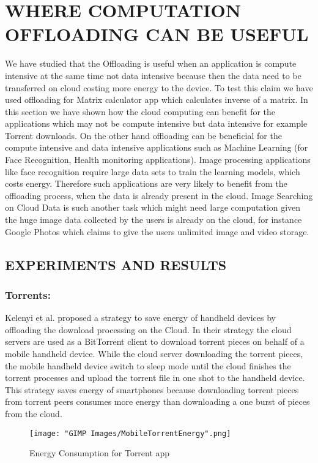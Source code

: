 \documentclass[12pt]{report}
\begin{document}
\chapter{WHERE COMPUTATION OFFLOADING CAN BE USEFUL}
We have studied that the Offloading is useful when an application is compute intensive at the same time not data intensive because then the data need to be transferred on cloud costing more energy to the device. To test this claim we have used offloading for Matrix calculator app which calculates inverse of a matrix.
In this section we have shown how the cloud computing can benefit for the applications which may not be compute intensive but data intensive for example Torrent downloads. On the other hand offloading can be beneficial for the compute intensive and data intensive applications such as Machine Learning (for Face Recognition, Health monitoring applications). Image processing applications like face recognition require large data sets to train the learning models, which costs energy. Therefore such applications are very likely to benefit from the offloading process, when the data is already present in the cloud. Image Searching on Cloud Data is such another task which might need large computation given the huge image data collected by the users is already on the cloud, for instance Google Photos which claims to give the users unlimited image and video storage. 

\section{EXPERIMENTS AND RESULTS}
\subsection{Torrents:}
Kelenyi et al. \cite{kelenyi2010cloudtorrent} proposed a strategy to save energy of handheld devices by offloading the download processing on the Cloud. In their strategy the cloud servers are used as a BitTorrent client to download torrent pieces on behalf of a mobile handheld device. While the cloud server downloading the torrent pieces, the mobile handheld device switch to sleep mode until the cloud finishes the torrent processes and upload the torrent file in one shot to the handheld device. This strategy saves energy of smartphones because downloading torrent pieces from torrent peers consumes more energy than downloading a one burst of pieces from the cloud. 
\begin{figure}[h]
  \centering
  \texttt{[image: "GIMP Images/MobileTorrentEnergy".png]}
  \caption{Energy Consumption for Torrent app}
  \label{fig:MobileTorrentEnergy}
\end{figure}
\end{document}
